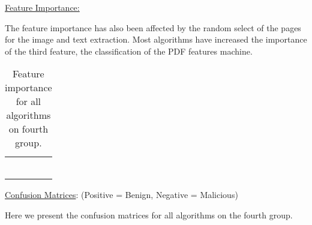 \documentclass{article}
\begin{document}
\noindent\underline{Feature Importance:}

\indent	The feature importance has also been affected by the random select of the pages for the image and text extraction. Most algorithms have increased the importance of the third feature, the classification of the PDF features machine.

\begin{table}[htb]
\centering
\begin{tabular}{|M{2.5cm}|M{2.5cm}|M{2.5cm}|M{2.5cm}|}
	\hline
	\centering{} &  &  & \tabularnewline
	\hline
	 &  &  & \tabularnewline
	\hline
	 &  &  & \tabularnewline
	\hline
	 &  &  & \tabularnewline
	\hline
	 &  &  & \tabularnewline
	\hline
	 &  &  & \tabularnewline
	\hline
	 &  &  & \tabularnewline
	\hline	
\end{tabular}
\caption{Feature importance for all algorithms on fourth group.}
\end{table}

\noindent\underline{Confusion Matrices}: (Positive = Benign, Negative = Malicious)

\indent Here we present the confusion matrices for all algorithms on the fourth group.
\end{document}
